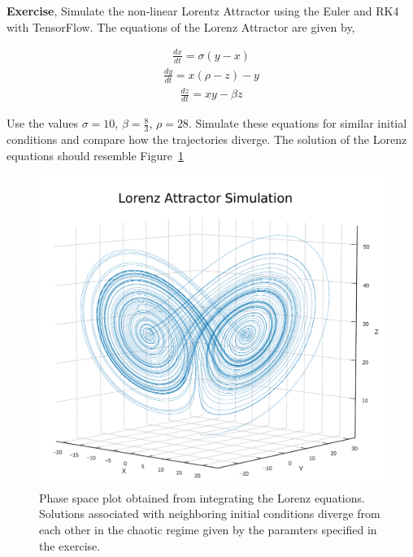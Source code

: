 \documentclass[10pt,letterpaper]{article}
\begin{document}
\textbf{Exercise}, Simulate the non-linear Lorentz Attractor using the Euler and RK4 with TensorFlow. The equations of the Lorenz Attractor are given by,

\begin{eqnarray}\frac{dx}{dt}=\sigma(y-x) \end{eqnarray}
\begin{eqnarray}\frac{dy}{dt}=x(\rho-z)-y \end{eqnarray}
\begin{eqnarray}\frac{dz}{dt}=xy-\beta z \end{eqnarray}

Use the values $\sigma =10$, $\beta =\frac{8}{3}$, $\rho =28$. Simulate these equations for similar initial conditions and compare how the trajectories diverge. The solution of the Lorenz equations should resemble Figure~\ref{fig:Lorenz}
 
\begin{figure}[H]
\begin{center}
\includegraphics[scale=0.5]{Figures/fig6_op.pdf} 
\caption{Phase space plot obtained from integrating the Lorenz equations. Solutions associated with neighboring initial conditions diverge from each other in the chaotic regime given by the paramters specified in the exercise.}
\label{fig:Lorenz}
\end{center}

\end{figure}
\end{document}
